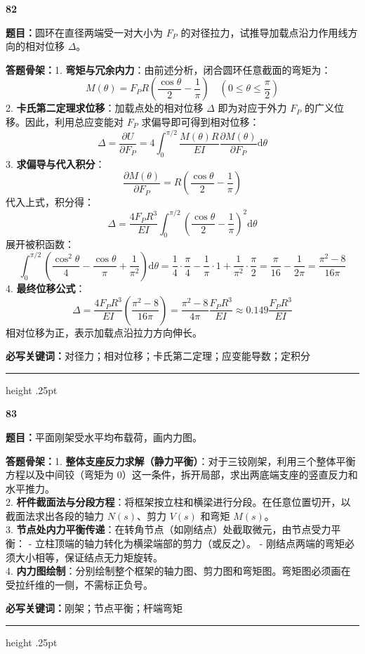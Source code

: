 \documentclass[a4paper,10pt]{article}
\newcommand{\qitem}[5]{%
\Needspace{6\baselineskip}
\vspace{3pt}
{\Large\bfseries\color{deep} #1}\quad{\bfseries\color{orangea}#2}\par
\textbf{题目：}#3\par
\textbf{答题骨架：}#4\par
\textbf{必写关键词：}{\color{bluea}#5}\par
\vspace{2pt}\hrule height .25pt
}
\begin{document}
\qitem{82}{圆环位移}
{圆环在直径两端受一对大小为 \(F_P\) 的对径拉力，试推导加载点沿力作用线方向的相对位移 \(\Delta\)。}
{1. \textbf{弯矩与冗余内力}：由前述分析，闭合圆环任意截面的弯矩为：
   \[ M(\theta) = F_P R \left( \frac{\cos\theta}{2} - \frac{1}{\pi} \right) \quad \left(0 \le \theta \le \frac{\pi}{2}\right) \]
2. \textbf{卡氏第二定理求位移}：加载点处的相对位移 \(\Delta\) 即为对应于外力 \(F_P\) 的广义位移。因此，利用总应变能对 \(F_P\) 求偏导即可得到相对位移：
   \[ \Delta = \frac{\partial U}{\partial F_P} = 4 \int_0^{\pi/2} \frac{M(\theta) R}{EI} \frac{\partial M(\theta)}{\partial F_P} \mathrm{d}\theta \]
3. \textbf{求偏导与代入积分}：
   \[ \frac{\partial M(\theta)}{\partial F_P} = R \left( \frac{\cos\theta}{2} - \frac{1}{\pi} \right) \]
   代入上式，积分得：
   \[ \Delta = \frac{4 F_P R^3}{EI} \int_0^{\pi/2} \left( \frac{\cos\theta}{2} - \frac{1}{\pi} \right)^2 \mathrm{d}\theta \]
   展开被积函数：
   \[ \int_0^{\pi/2} \left( \frac{\cos^2\theta}{4} - \frac{\cos\theta}{\pi} + \frac{1}{\pi^2} \right) \mathrm{d}\theta = \frac{1}{4}\cdot \frac{\pi}{4} - \frac{1}{\pi}\cdot 1 + \frac{1}{\pi^2}\cdot \frac{\pi}{2} = \frac{\pi}{16} - \frac{1}{2\pi} = \frac{\pi^2 - 8}{16\pi} \]
4. \textbf{最终位移公式}：
   \[ \Delta = \frac{4 F_P R^3}{EI} \left( \frac{\pi^2 - 8}{16\pi} \right) = \frac{\pi^2 - 8}{4\pi} \frac{F_P R^3}{EI} \approx 0.149 \frac{F_P R^3}{EI} \]
   相对位移为正，表示加载点沿拉力方向伸长。}
{对径力；相对位移；卡氏第二定理；应变能导数；定积分}

\qitem{83}{三铰/两铰框架}
{平面刚架受水平均布载荷，画内力图。}
{1. \textbf{整体支座反力求解（静力平衡）}：对于三铰刚架，利用三个整体平衡方程以及中间铰（弯矩为 0）这一条件，拆开局部，求出两底端支座的竖直反力和水平推力。\\
2. \textbf{杆件截面法与分段方程}：将框架按立柱和横梁进行分段。在任意位置切开，以截面法求出各段的轴力 \(N(s)\)、剪力 \(V(s)\) 和弯矩 \(M(s)\)。\\
3. \textbf{节点处内力平衡传递}：在转角节点（如刚结点）处截取微元，由节点受力平衡：
   - 立柱顶端的轴力转化为横梁端部的剪力（或反之）。
   - 刚结点两端的弯矩必须大小相等，保证结点无力矩旋转。\\
4. \textbf{内力图绘制}：分别绘制整个框架的轴力图、剪力图和弯矩图。弯矩图必须画在受拉纤维的一侧，不需标正负号。}
{刚架；节点平衡；杆端弯矩}
\end{document}
